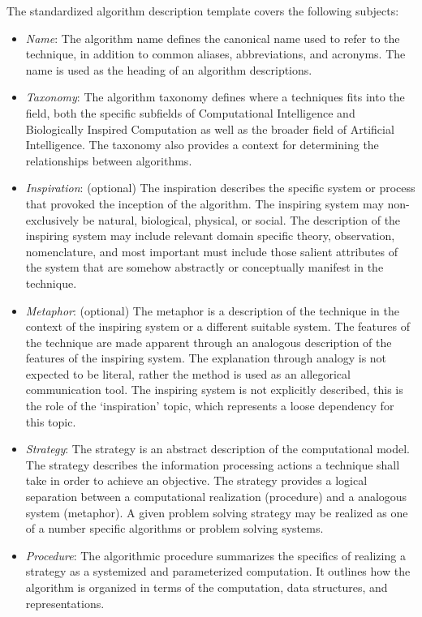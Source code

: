 \begin{bibunit}
The standardized algorithm description template covers the following subjects:
\begin{itemize}
	\item \emph{Name}: The algorithm name defines the canonical name used to refer to the technique, in addition to common aliases, abbreviations, and acronyms. The name is used as the heading of an algorithm descriptions.
	\item \emph{Taxonomy}: The algorithm taxonomy defines where a techniques fits into the field, both the specific subfields of Computational Intelligence and Biologically Inspired Computation as well as the broader field of Artificial Intelligence. The taxonomy also provides a context for determining the relationships between algorithms.
	\item \emph{Inspiration}: (optional) The inspiration describes the specific system or process that provoked the inception of the algorithm. The inspiring system may non-exclusively be natural, biological, physical, or social. The description of the inspiring system may include relevant domain specific theory, observation, nomenclature, and most important must include those salient attributes of the system that are somehow abstractly or conceptually manifest in the technique.
	\item \emph{Metaphor}: (optional) The metaphor is a description of the technique in the context of the inspiring system or a different suitable system. The features of the technique are made apparent through an analogous description of the features of the inspiring system. The explanation through analogy is not expected to be literal, rather the method is used as an allegorical communication tool. The inspiring system is not explicitly described, this is the role of the `inspiration' topic, which represents a loose dependency for this topic.
	\item \emph{Strategy}: The strategy is an abstract description of the computational model. The strategy describes the information processing actions a technique shall take in order to achieve an objective. The strategy provides a logical separation between a computational realization (procedure) and a analogous system (metaphor). A given problem solving strategy may be realized as one of a number specific algorithms or problem solving systems.
	\item \emph{Procedure}: The algorithmic procedure summarizes the specifics of realizing a strategy as a systemized and parameterized computation. It outlines how the algorithm is organized in terms of the computation, data structures, and representations. 

\end{itemize}
\end{bibunit}

